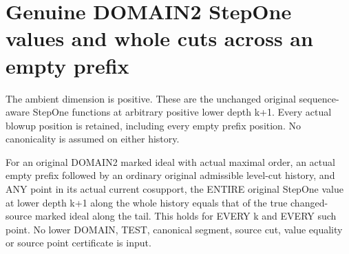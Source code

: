 \section{Genuine DOMAIN2 StepOne values and whole cuts across an empty prefix}

The ambient dimension is positive. These are the unchanged original
sequence-aware StepOne functions at arbitrary positive lower depth k+1.
Every actual blowup position is retained, including every empty prefix
position. No canonicality is assumed on either history.

\begin{theorem}
\label{hir:original-bound-two-stepone-empty-prefix-values}
\leanok
For an original DOMAIN2 marked ideal with actual maximal order, an actual
empty prefix followed by an ordinary original admissible level-cut history,
and ANY point in its actual current cosupport, the ENTIRE original StepOne
value at lower depth k+1 along the whole history equals that of the true
changed-source marked ideal along the tail. This holds for EVERY k and
EVERY such point. No lower DOMAIN, TEST, canonical segment, source cut,
value equality or source point certificate is input.
\end{theorem}
